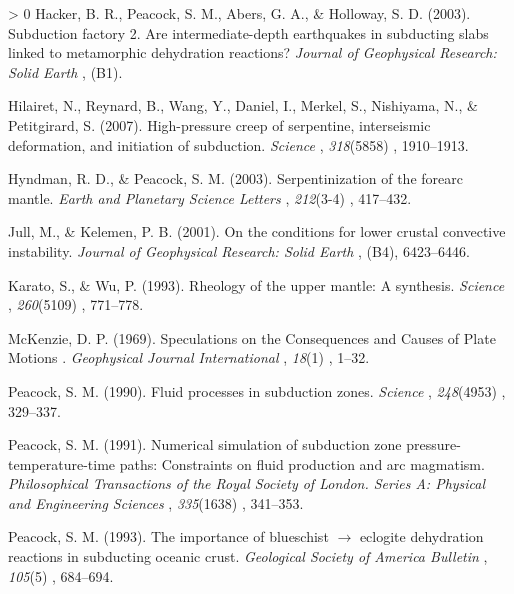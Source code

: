 \documentclass[draft,linenumbers]{agujournal2018} %
\newlength{\cslhangindent} %
\newenvironment{CSLReferences}[3] %
 {%
  \setlength{\parindent}{0pt} %
  \ifodd #1 \everypar{\setlength{\hangindent}{\cslhangindent}}\ignorespaces\fi %
  \ifnum #2 > 0 %
  \setlength{\parskip}{#2\baselineskip} %
  \fi %
 }%
 {} %
\providecommand{\DIFaddtex}[1]{{\protect\color{blue} \sf #1}} %
\providecommand{\DIFadd}[1]{\texorpdfstring{\DIFaddtex{#1}}{#1}} %
\begin{document}
\begin{CSLReferences}{1}{0}
\leavevmode\hypertarget{ref-Hacker2003}{}%
\DIFadd{Hacker, B. R., Peacock, S. M., Abers, G. A., \& Holloway, S. D. (2003).
}{\DIFadd{Subduction factory 2. Are intermediate-depth earthquakes in subducting
slabs linked to metamorphic dehydration reactions?}} \emph{\DIFadd{Journal of
Geophysical Research: Solid Earth}}\DIFadd{, }\emph{\DIFadd{108}}\DIFadd{(B1).
}

\leavevmode\hypertarget{ref-Hilairet2007}{}%
\DIFadd{Hilairet, N., Reynard, B., Wang, Y., Daniel, I., Merkel, S., Nishiyama,
N., \& Petitgirard, S. (2007). High-pressure creep of serpentine,
interseismic deformation, and initiation of subduction. }\emph{\DIFadd{Science}}\DIFadd{,
}\emph{318}(5858)\DIFadd{, 1910--1913.
}

\leavevmode\hypertarget{ref-Hyndman2003}{}%
\DIFadd{Hyndman, R. D., \& Peacock, S. M. (2003). Serpentinization of the
forearc mantle. }\emph{\DIFadd{Earth and Planetary Science Letters}}\DIFadd{,
}\emph{212}(3-4)\DIFadd{, 417--432.
}

\leavevmode\hypertarget{ref-Jull2001}{}%
\DIFadd{Jull, M., \& Kelemen, P. B. (2001). On the conditions for lower crustal
convective instability. }\emph{\DIFadd{Journal of Geophysical Research: Solid
Earth}}\DIFadd{, }\emph{\DIFadd{106}}\DIFadd{(B4), 6423--6446.
}

\leavevmode\hypertarget{ref-Karato1993}{}%
\DIFadd{Karato, S., \& Wu, P. (1993). Rheology of the upper mantle: A synthesis.
}\emph{\DIFadd{Science}}\DIFadd{, }\emph{260}(5109)\DIFadd{, 771--778.
}

\leavevmode\hypertarget{ref-McKenzie1969}{}%
\DIFadd{McKenzie, D. P. (1969). }{\DIFadd{Speculations on the Consequences and Causes of
Plate Motions}}\DIFadd{. }\emph{\DIFadd{Geophysical Journal International}}\DIFadd{, }\emph{18}(1)\DIFadd{,
1--32.
}

\leavevmode\hypertarget{ref-Peacock1990}{}%
\DIFadd{Peacock, S. M. (1990). Fluid processes in subduction zones.
}\emph{\DIFadd{Science}}\DIFadd{, }\emph{248}(4953)\DIFadd{, 329--337.
}

\leavevmode\hypertarget{ref-Peacock1991}{}%
\DIFadd{Peacock, S. M. (1991). Numerical simulation of subduction zone
pressure-temperature-time paths: Constraints on fluid production and arc
magmatism. }\emph{\DIFadd{Philosophical Transactions of the Royal Society of
London. Series A: Physical and Engineering Sciences}}\DIFadd{, }\emph{335}(1638)\DIFadd{,
341--353.
}

\leavevmode\hypertarget{ref-Peacock1993}{}%
\DIFadd{Peacock, S. M. (1993). The importance of blueschist \(\rightarrow\)
eclogite dehydration reactions in subducting oceanic crust.
}\emph{\DIFadd{Geological Society of America Bulletin}}\DIFadd{, }\emph{105}(5)\DIFadd{, 684--694.
}


\end{CSLReferences}
\end{document}
